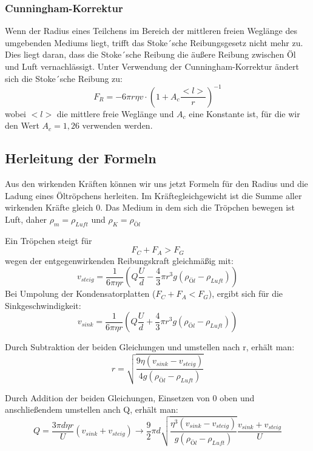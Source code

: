 \documentclass{scrartcl}
\begin{document}
		\subsubsection{Cunningham-Korrektur}
			Wenn der Radius eines Teilchens im Bereich der mittleren freien Weglänge des umgebenden Mediums liegt, trifft das Stoke´sche Reibungsgesetz nicht mehr zu.
			Dies liegt daran, dass die Stoke´sche Reibung die äußere Reibung zwischen Öl und Luft vernachlässigt.
			Unter Verwendung der Cunningham-Korrektur ändert sich die Stoke´sche Reibung zu:
			\begin{equation}
				F_R = -6 \pi r \eta v \cdot (1 + A_c \frac{<l>}{r})^{-1}
			\end{equation}
			wobei $<l>$ die mittlere freie Weglänge und $A_c$ eine Konstante ist, für die wir den Wert $A_c = 1,26$ verwenden werden.
		\subsection{Herleitung der Formeln}
			Aus den wirkenden Kräften können wir uns jetzt Formeln für den Radius und die Ladung eines Öltröpchens herleiten.
			Im Kräftegleichgewicht ist die Summe aller wirkenden Kräfte gleich 0.
			Das Medium in dem sich die Tröpchen bewegen ist Luft, daher	$\rho_m  = \rho_{Luft}$ und $\rho_K = \rho_{Öl}$

			Ein Tröpchen steigt für
			\begin{equation}
				F_C + F_A > F_G
			\end{equation}
			wegen der entgegenwirkenden  Reibungskraft gleichmäßig mit:
			\begin{equation}
				v_{steig} = \frac{1}{6\pi \eta r} (Q \frac{U}{d}-\frac{4}{3}\pi r^3 g (\rho_{Öl}-\rho_{Luft}))
			\end{equation}
			Bei Umpolung der Kondensatorplatten ($F_C + F_A < F_G$), ergibt sich für die Sinkgeschwindigkeit:
			\begin{equation}
				v_{sink} = \frac{1}{6\pi \eta r} (Q \frac{U}{d}+\frac{4}{3}\pi r^3 g (\rho_{Öl}-\rho_{Luft}))
			\end{equation}

			Durch Subtraktion der beiden Gleichungen und umstellen nach r, erhält man:
			\begin{equation}
				r = \sqrt{\frac{9 \eta (v_{sink} - v_{steig})}{4 g (\rho_{Öl} - \rho_{Luft})}}
			\end{equation}

			Durch Addition der beiden Gleichungen, Einsetzen von 0 oben und anschließendem umstellen anch Q, erhält man:
			\begin{equation}
				Q = \frac{3 \pi d \eta r}{U} (v_{sink} + v_{steig})
				\rightarrow \frac{9}{2} \pi d \sqrt{\frac{\eta^3 (v_{sink} - v_{steig})}{g (\rho_{Öl} - \rho_{Luft})}} \frac{v_{sink} + v_{steig}}{U} 
			\end{equation}
\end{document}
